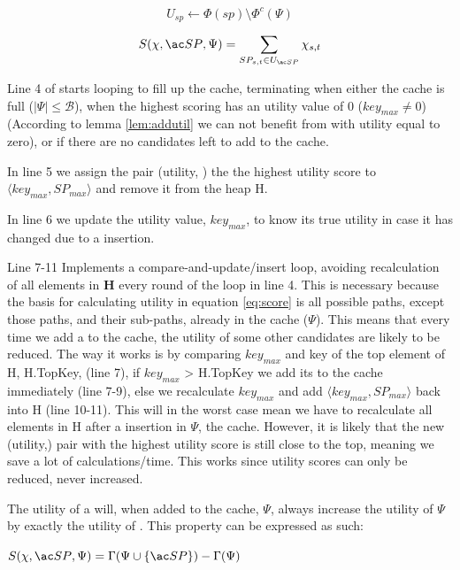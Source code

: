 \begin{equation} \label{eq:usp}
U_{sp} \leftarrow \Phi(sp) \setminus \Phi^c(\Psi)
\end{equation}

\begin{equation} \label{eq:score}
S(\chi, \spath, \Psi) = \sum\limits_{SP_{s,t} \in U_{\spath}} \chi_{s,t}
\end{equation}


Line 4 of \salgo starts looping to fill up the cache, terminating when either the cache is full ($| \Psi | \leq  \mathcal{B}$), when the highest scoring \spath has an utility value of 0 ($key_{max} \neq 0$) (According to lemma \ref{lem:addutil} we can not benefit from \spaths with utility equal to zero), or if there are no \spath candidates left to add to the cache.

In line 5 we assign the pair (utility, \spath) the the highest utility score to $\langle  key_{max},  SP_{max} \rangle$ and remove it from the heap H.

In line 6 we update the utility value, $key_{max}$, to know its true utility in case it has changed due to a \spath insertion.

Line 7-11 Implements a compare-and-update/insert loop, avoiding recalculation of all elements in \textbf{H} every round of the loop in line 4. This is necessary because the basis for calculating utility in equation \ref{eq:score} is all possible paths, except those paths, and their sub-paths, already in the cache ($\Psi$). This means that every time we add a \spath to the cache, the utility of some other candidates are likely to be reduced. The way it works is by comparing $key_{max}$ and key of the top element of H, H.TopKey, (line 7), if $key_{max}$ >  H.TopKey we add its \spath to the cache immediately (line 7-9), else we recalculate $key_{max}$ and add $\langle  key_{max},  SP_{max} \rangle$ back into H (line 10-11). This will in the worst case mean we have to recalculate all elements in H after a \spath insertion in $\Psi$, the cache. However, it is likely that the new (utility,\spath) pair with the highest utility score is still close to the top, meaning we save a lot of calculations/time. This works since utility scores can only be reduced, never increased.


\begin{lemma}\label{lem:addutil}
The utility of a \spath will, when added to the cache, $\Psi$, always increase the utility of $\Psi$ by exactly the utility of \spath. This property can be expressed as such:

$S(\chi, \spath, \Psi) = \Gamma(\Psi \cup \{\spath\}) - \Gamma(\Psi)$

\end{lemma}


